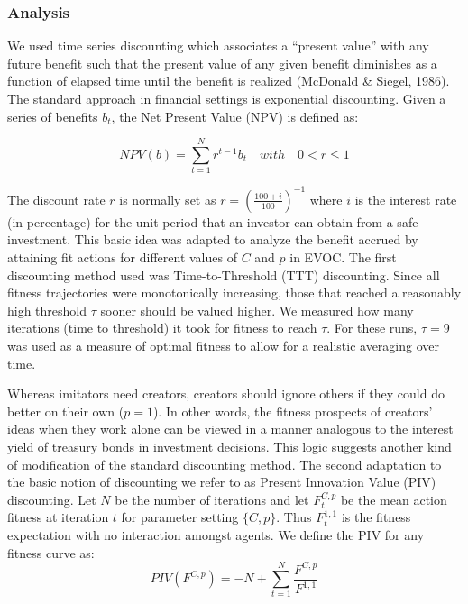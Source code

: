 \documentclass[a4paper,12pt,man,british]{apa6}
\begin{document}
\subsubsection{Analysis}
We used time series discounting which associates a ``present value'' with any future benefit such that the present value of any given benefit diminishes as a function of elapsed time until the benefit is 
realized (McDonald \& Siegel, 1986). The standard approach in financial settings is exponential discounting. Given a series of benefits $b_{t}$, the Net Present Value (NPV) is defined as:

\begin{equation}
NPV(b) =  \displaystyle\sum_{t=1}^N r^{t-1}  b_{t} \quad with \quad 0 < r \leq 1
\label{eq:npv}
\end{equation}

The discount rate $r$ is normally set as $r = (\frac{100+i}{100})^{-1}$ where $i$ is the interest rate (in percentage) for the unit period that an investor can obtain from a safe investment. 
This basic idea was adapted to analyze the benefit accrued by attaining fit actions for different values of $C$ and $p$ in EVOC. The first discounting method used was Time-to-Threshold (TTT) discounting. Since all fitness trajectories were monotonically increasing, those that reached a reasonably high threshold $\tau$ sooner should be valued higher. We measured how many iterations (time to threshold) it took for fitness to reach $\tau$. For these runs, $\tau = 9$ was used as a measure of optimal fitness to allow for a realistic averaging over time. 

Whereas imitators need creators, creators should ignore others if they could do better on their 
own ($p = 1$). In other words, the fitness prospects of creators' ideas when they work alone can be viewed in a manner analogous to the interest yield of treasury bonds in investment decisions. This logic suggests another kind of modification of the standard discounting method. The second adaptation to the basic notion of discounting we refer to as Present Innovation Value (PIV) discounting. Let $N$ be the number of iterations and let $F_{t}^{C,p}$ be the mean action fitness at iteration $t$ for parameter 
setting $\{C, p\}$. Thus $F_{t}^{1,1}$ is the fitness expectation with no interaction amongst agents. We define the PIV for any fitness curve as:
\begin{equation}
PIV(F^{C,p}) = - N + \displaystyle\sum_{t=1}^N \frac{F^{C,p}}{F^{1,1}}
\label{eq:piv}
\end{equation}
\end{document}
